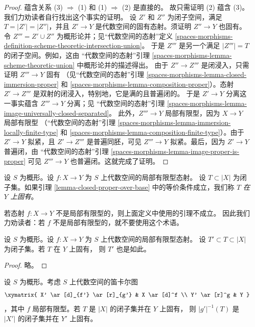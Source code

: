 \begin{proof}
蕴含关系 (3) $\Rightarrow$ (1) 和 (1) $\Rightarrow$ (2) 是直接的。
故只需证明 (2) 蕴含 (3)。我们力劝读者自行找出这个事实的证明。
设 $Z'$ 和 $Z''$ 为闭子空间，满足 $T = |Z'| = |Z''|$，并且
$Z' \to Y$ 是代数空间的固有态射。须证明 $Z'' \to Y$ 也固有。
令 $Z''' = Z' \cup Z''$ 为概形论并；见“代数空间的态射”定义
\ref{spaces-morphisms-definition-scheme-theoretic-intersection-union}。
于是 $Z'''$ 是另一个满足 $|Z'''| = T$ 的闭子空间。例如，这由
“代数空间的态射”引理
\ref{spaces-morphisms-lemma-scheme-theoretic-union} 中概形论并的描述得出。
由于 $Z'' \to Z'''$ 是闭浸入，只需证明 $Z''' \to Y$ 固有
（见“代数空间的态射”引理
\ref{spaces-morphisms-lemma-closed-immersion-proper} 和
\ref{spaces-morphisms-lemma-composition-proper}）。态射
$Z' \to Z'''$ 是双射的闭浸入，特别地，它是满的且普遍闭的。
于是 $Z' \to Y$ 分离这一事实蕴含 $Z''' \to Y$ 分离；见
“代数空间的态射”引理
\ref{spaces-morphisms-lemma-image-universally-closed-separated}。
此外，$Z''' \to Y$ 局部有限型，因为 $X \to Y$ 局部有限型
（“代数空间的态射”引理
\ref{spaces-morphisms-lemma-immersion-locally-finite-type} 和
\ref{spaces-morphisms-lemma-composition-finite-type}）。由于
$Z' \to Y$ 拟紧，且 $Z' \to Z'''$ 是普遍同胚，可见
$Z''' \to Y$ 拟紧。最后，因为 $Z' \to Y$ 普遍闭，由
“代数空间的态射”引理
\ref{spaces-morphisms-lemma-image-proper-is-proper} 可见
$Z''' \to Y$ 也普遍闭。这就完成了证明。
\end{proof}

\begin{definition}
\label{definition-proper-over-base}
设 $S$ 为概形。设 $f : X \to Y$ 为 $S$ 上代数空间的局部有限型态射。
设 $T \subset |X|$ 为闭子集。如果引理
\ref{lemma-closed-proper-over-base} 中的等价条件成立，我们称
{\it $T$ 在 $Y$ 上固有}。
\end{definition}

\noindent
若态射 $f : X \to Y$ 不是局部有限型的，则上面定义中使用的引理不成立。
因此我们力劝读者：若 $f$ 不是局部有限型的，就不要使用这个术语。

\begin{lemma}
\label{lemma-closed-closed-proper-over-base}
设 $S$ 为概形。设 $f : X \to Y$ 为 $S$ 上代数空间的局部有限型态射。
设 $T' \subset T \subset |X|$ 为闭子集。若 $T$ 在 $Y$ 上固有，
则 $T'$ 也是如此。
\end{lemma}

\begin{proof}
略。
\end{proof}

\begin{lemma}
\label{lemma-base-change-closed-proper-over-base}
设 $S$ 为概形。考虑 $S$ 上代数空间的笛卡尔图
$$
\xymatrix{
X' \ar[d]_{f'} \ar[r]_{g'} & X \ar[d]^f \\
Y' \ar[r]^g & Y
}
$$
，其中 $f$ 局部有限型。若 $T$ 是 $|X|$ 的闭子集并在 $Y$ 上固有，
则 $|g'|^{-1}(T)$ 是 $|X'|$ 的闭子集并在 $Y'$ 上固有。
\end{lemma}

